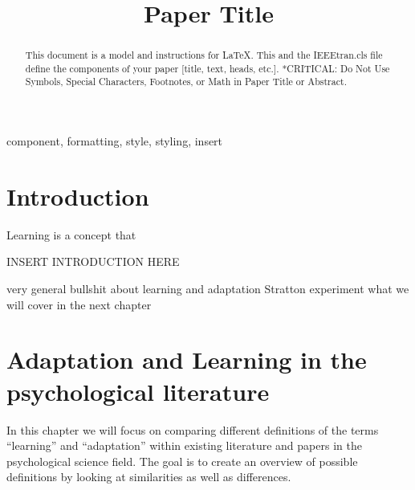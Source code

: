 \documentclass[conference]{IEEEtran}
\begin{document}


\title{Paper Title}

\author{
\and
{}
}

\maketitle

\begin{abstract}
	This document is a model and instructions for \LaTeX.
	This and the IEEEtran.cls file define the components of your paper [title, text, heads, etc.]. *CRITICAL: Do Not Use Symbols, Special Characters, Footnotes,
	or Math in Paper Title or Abstract.
\end{abstract}

\begin{IEEEkeywords}
	component, formatting, style, styling, insert
\end{IEEEkeywords}

\section{Introduction}

	Learning is a concept that

	INSERT INTRODUCTION HERE

	very general bullshit about learning and adaptation
	Stratton experiment
	what we will cover in the next chapter

\section{Adaptation and Learning in the psychological literature}

	In this chapter we will focus on comparing different definitions of the terms “learning” and “adaptation” within existing literature and papers in the psychological science field. The goal is to create an overview of possible definitions by looking at similarities as well as differences.
\end{document}
